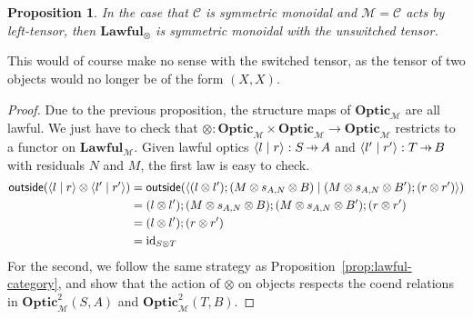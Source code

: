 \documentclass[11pt,letterpaper]{article}
\theoremstyle{plain}
\newtheorem{proposition}[theorem]{Proposition}
\theoremstyle{definition}
\newcommand{\C}{\mathscr{C}}
\newcommand{\M}{\mathscr{M}}
\newcommand{\Optic}{\mathbf{Optic}}
\newcommand{\Twoptic}{\mathbf{Optic}^2}
\newcommand{\Lawful}{\mathbf{Lawful}}
\newcommand{\id}{\mathrm{id}}
\newcommand{\rep}[2]{{\ensuremath \left\langle #1 \mid #2 \right\rangle}}
\newcommand{\outside}{\mathsf{outside}}
\newcommand{\hto}{\ensuremath{\,\mathaccent\shortmid\rightarrow\,}}
\begin{document}
\begin{proposition}
  In the case that $\C$ is symmetric monoidal and $\M = \C$ acts by left-tensor, then $\Lawful_\otimes$ is symmetric monoidal with the unswitched tensor.
\end{proposition}
This would of course make no sense with the switched tensor, as the tensor of two objects would no longer be of the form $(X, X)$.
\begin{proof}
Due to the previous proposition, the structure maps of $\Optic_\M$ are all lawful. We just have to check that $\otimes : \Optic_\M \times \Optic_\M \to \Optic_\M$ restricts to a functor on $\Lawful_\M$. Given lawful optics $\rep{l}{r} : S \hto A$ and $\rep{l'}{r'} : T \hto B$ with residuals $N$ and $M$, the first law is easy to check.
\begin{align*}
\outside(\rep{l}{r} \otimes \rep{l'}{r'})
&= \outside(\rep{(l \otimes l');(M \otimes s_{A,N} \otimes B)}{(M \otimes s_{A,N} \otimes B');(r \otimes r')}) \\
&= (l \otimes l');(M \otimes s_{A,N} \otimes B);(M \otimes s_{A,N} \otimes B');(r \otimes r') \\
&= (l \otimes l');(r \otimes r') \\
&= \id_{S \otimes T}
\end{align*}
For the second, we follow the same strategy as Proposition~\ref{prop:lawful-category}, and show that the action of $\otimes$ on objects respects the coend relations in $\Twoptic_\M(S, A)$ and $\Twoptic_\M(T, B)$.


\end{proof}
\end{document}
